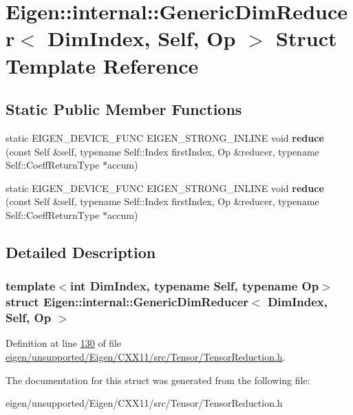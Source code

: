 \hypertarget{struct_eigen_1_1internal_1_1_generic_dim_reducer}{}\section{Eigen\+:\+:internal\+:\+:Generic\+Dim\+Reducer$<$ Dim\+Index, Self, Op $>$ Struct Template Reference}
\label{struct_eigen_1_1internal_1_1_generic_dim_reducer}
\subsection*{Static Public Member Functions}
\begin{DoxyCompactItemize}
\item 
\mbox{\label{struct_eigen_1_1internal_1_1_generic_dim_reducer_ad65e721ea1322448fb0ac5558897396c}} 
static E\+I\+G\+E\+N\+\_\+\+D\+E\+V\+I\+C\+E\+\_\+\+F\+U\+NC E\+I\+G\+E\+N\+\_\+\+S\+T\+R\+O\+N\+G\+\_\+\+I\+N\+L\+I\+NE void {\bfseries reduce} (const Self \&self, typename Self\+::\+Index first\+Index, Op \&reducer, typename Self\+::\+Coeff\+Return\+Type $\ast$accum)
\item 
\mbox{\label{struct_eigen_1_1internal_1_1_generic_dim_reducer_ad65e721ea1322448fb0ac5558897396c}} 
static E\+I\+G\+E\+N\+\_\+\+D\+E\+V\+I\+C\+E\+\_\+\+F\+U\+NC E\+I\+G\+E\+N\+\_\+\+S\+T\+R\+O\+N\+G\+\_\+\+I\+N\+L\+I\+NE void {\bfseries reduce} (const Self \&self, typename Self\+::\+Index first\+Index, Op \&reducer, typename Self\+::\+Coeff\+Return\+Type $\ast$accum)
\end{DoxyCompactItemize}


\subsection{Detailed Description}
\subsubsection*{template$<$int Dim\+Index, typename Self, typename Op$>$\newline
struct Eigen\+::internal\+::\+Generic\+Dim\+Reducer$<$ Dim\+Index, Self, Op $>$}



Definition at line \hyperlink{eigen_2unsupported_2_eigen_2_c_x_x11_2src_2_tensor_2_tensor_reduction_8h_source_l00130}{130} of file \hyperlink{eigen_2unsupported_2_eigen_2_c_x_x11_2src_2_tensor_2_tensor_reduction_8h_source}{eigen/unsupported/\+Eigen/\+C\+X\+X11/src/\+Tensor/\+Tensor\+Reduction.\+h}.



The documentation for this struct was generated from the following file\+:\begin{DoxyCompactItemize}
\item 
eigen/unsupported/\+Eigen/\+C\+X\+X11/src/\+Tensor/\+Tensor\+Reduction.\+h\end{DoxyCompactItemize}
